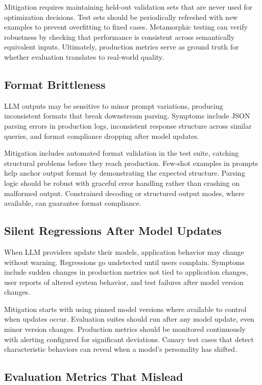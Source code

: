 Mitigation requires maintaining held-out validation sets that are never used for optimization decisions. Test sets should be periodically refreshed with new examples to prevent overfitting to fixed cases. Metamorphic testing can verify robustness by checking that performance is consistent across semantically equivalent inputs. Ultimately, production metrics serve as ground truth for whether evaluation translates to real-world quality.

\subsection{Format Brittleness}

LLM outputs may be sensitive to minor prompt variations, producing inconsistent formats that break downstream parsing. Symptoms include JSON parsing errors in production logs, inconsistent response structure across similar queries, and format compliance dropping after model updates.

Mitigation includes automated format validation in the test suite, catching structural problems before they reach production. Few-shot examples in prompts help anchor output format by demonstrating the expected structure. Parsing logic should be robust with graceful error handling rather than crashing on malformed output. Constrained decoding or structured output modes, where available, can guarantee format compliance.

\subsection{Silent Regressions After Model Updates}

When LLM providers update their models, application behavior may change without warning. Regressions go undetected until users complain. Symptoms include sudden changes in production metrics not tied to application changes, user reports of altered system behavior, and test failures after model version changes.

Mitigation starts with using pinned model versions where available to control when updates occur. Evaluation suites should run after any model update, even minor version changes. Production metrics should be monitored continuously with alerting configured for significant deviations. Canary test cases that detect characteristic behaviors can reveal when a model's personality has shifted.

\subsection{Evaluation Metrics That Mislead}

